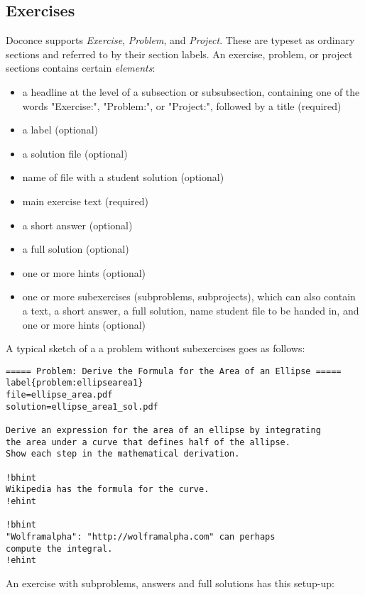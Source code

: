 \documentclass[twoside]{article}
\begin{document}
\subsection{Exercises}

Doconce supports \emph{Exercise}, \emph{Problem}, and \emph{Project}. These are typeset
as ordinary sections and referred to by their section labels.
An exercise, problem, or project sections contains certain \emph{elements}:

\begin{itemize}
  \item a headline at the level of a subsection or subsubsection,
    containing one of the words "Exercise:", "Problem:", or
    "Project:", followed by a title (required)

  \item a label (optional)

  \item a solution file (optional)

  \item name of file with a student solution (optional)

  \item main exercise text (required)

  \item a short answer (optional)

  \item a full solution (optional)

  \item one or more hints (optional)

  \item one or more subexercises (subproblems, subprojects), which can also
    contain a text, a short answer, a full solution, name student file
    to be handed in, and one or more hints (optional)
\end{itemize}

\noindent
A typical sketch of a a problem without subexercises goes as follows:
\begin{Verbatim}
===== Problem: Derive the Formula for the Area of an Ellipse =====
label{problem:ellipsearea1}
file=ellipse_area.pdf
solution=ellipse_area1_sol.pdf

Derive an expression for the area of an ellipse by integrating
the area under a curve that defines half of the allipse.
Show each step in the mathematical derivation.

!bhint
Wikipedia has the formula for the curve.
!ehint

!bhint
"Wolframalpha": "http://wolframalpha.com" can perhaps
compute the integral.
!ehint
\end{Verbatim}
An exercise with subproblems, answers and full solutions has this
setup-up:
\end{document}
